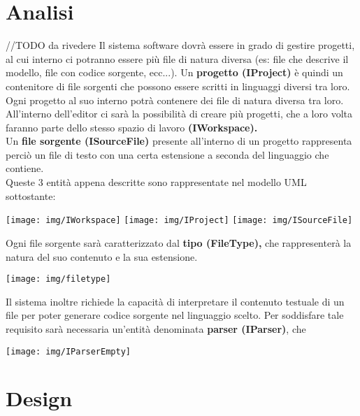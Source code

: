 \documentclass{article}
\begin{document}
  \section{Analisi}
  //TODO da rivedere
  Il sistema software dovrà essere in grado di gestire progetti, al cui interno ci potranno essere più file di natura diversa (es: file che descrive il modello,
  file con codice sorgente, ecc...). Un \textbf{progetto (IProject)} è quindi un contenitore di file sorgenti che possono essere scritti in linguaggi diversi tra loro.
  Ogni progetto al suo interno potrà contenere dei file di natura diversa tra loro. All'interno dell'editor ci sarà la possibilità di creare più progetti,
  che a loro volta faranno parte dello stesso spazio di lavoro \textbf{(IWorkspace).}\\
  Un \textbf{file sorgente (ISourceFile)} presente all'interno di un progetto rappresenta perciò un file di testo con una certa estensione a seconda del linguaggio che contiene.\\
  Queste 3 entità appena descritte sono rappresentate nel modello UML sottostante:
  \begin{center}
    \texttt{[image: img/IWorkspace]}
    \texttt{[image: img/IProject]}
    \texttt{[image: img/ISourceFile]}
  \end{center}
  Ogni file sorgente sarà caratterizzato dal \textbf{tipo (FileType),} che rappresenterà la natura del suo contenuto e la sua estensione.
  \begin{center}
    \texttt{[image: img/filetype]}
  \end{center}
  Il sistema inoltre richiede la capacità di interpretare il contenuto testuale di un file per poter generare codice sorgente nel linguaggio scelto.
  Per soddisfare tale requisito sarà necessaria un'entità denominata \textbf{parser (IParser)}, che
  \begin{center}
    \texttt{[image: img/IParserEmpty]}
  \end{center}




  \section{Design}
\end{document}
